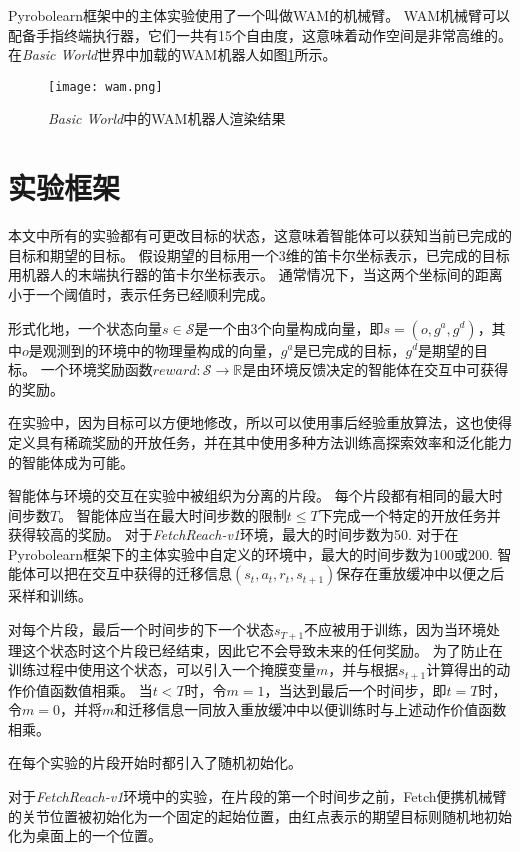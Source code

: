 Pyrobolearn框架中的主体实验使用了一个叫做WAM的机械臂。
WAM机械臂可以配备手指终端执行器，它们一共有15个自由度，这意味着动作空间是非常高维的。
在\emph{Basic World}世界中加载的WAM机器人如图\ref{wam}所示。
    \begin{figure}[htpb]
        \centering
        \texttt{[image: wam.png]}
        \caption{\emph{Basic World}中的WAM机器人渲染结果}
        \label{wam}
    \end{figure}

\section{实验框架}\label{expframe}
本文中所有的实验都有可更改目标的状态，这意味着智能体可以获知当前已完成的目标和期望的目标。
假设期望的目标用一个3维的笛卡尔坐标表示，已完成的目标用机器人的末端执行器的笛卡尔坐标表示。
通常情况下，当这两个坐标间的距离小于一个阈值时，表示任务已经顺利完成。

形式化地，一个状态向量$s\in\mathcal S$是一个由3个向量构成向量，即$s=(o,g^a,g^d)$，其中$o$是观测到的环境中的物理量构成的向量，$g^a$是已完成的目标，$g^d$是期望的目标。
一个环境奖励函数$reward:\mathcal S\to \mathbb R$是由环境反馈决定的智能体在交互中可获得的奖励。

在实验中，因为目标可以方便地修改，所以可以使用事后经验重放算法，这也使得定义具有稀疏奖励的开放任务，并在其中使用多种方法训练高探索效率和泛化能力的智能体成为可能。

智能体与环境的交互在实验中被组织为分离的片段。
每个片段都有相同的最大时间步数$T$。
智能体应当在最大时间步数的限制$t\leq T$下完成一个特定的开放任务并获得较高的奖励。
对于\emph{FetchReach-v1}环境，最大的时间步数为50.
对于在Pyrobolearn框架下的主体实验中自定义的环境中，最大的时间步数为100或200.
智能体可以把在交互中获得的迁移信息$(s_t,a_t,r_t,s_{t+1})$保存在重放缓冲\cite{DBLP:journals/corr/abs-1906-05253}中以便之后采样和训练。

对每个片段，最后一个时间步的下一个状态$s_{T+1}$不应被用于训练，因为当环境处理这个状态时这个片段已经结束，因此它不会导致未来的任何奖励。
为了防止在训练过程中使用这个状态，可以引入一个掩膜变量$m$，并与根据$s_{t+1}$计算得出的动作价值函数值相乘。
当$t<T$时，令$m=1$，当达到最后一个时间步，即$t=T$时，令$m=0$，并将$m$和迁移信息一同放入重放缓冲中以便训练时与上述动作价值函数相乘。

在每个实验的片段开始时都引入了随机初始化\cite{10.5555/3327546.3327601}。

对于\emph{FetchReach-v1}环境中的实验，在片段的第一个时间步之前，Fetch便携机械臂的关节位置被初始化为一个固定的起始位置，由红点表示的期望目标则随机地初始化为桌面上的一个位置。

